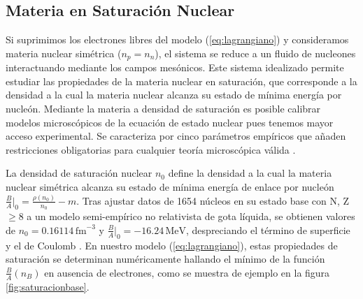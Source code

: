 \subsection{Materia en Saturación Nuclear}

Si suprimimos los electrones libres del modelo (\ref{eq:lagrangiano}) y consideramos materia nuclear simétrica ($n_p = n_n$), el sistema se reduce a un fluido de nucleones interactuando mediante los campos mesónicos. Este sistema idealizado permite estudiar las propiedades de la materia nuclear en saturación, que corresponde a la densidad a la cual la materia nuclear alcanza su estado de mínima energía por nucleón. Mediante la materia a densidad de saturación es posible calibrar modelos microscópicos de la ecuación de estado nuclear pues tenemos mayor acceso experimental. Se caracteriza por cinco parámetros empíricos que añaden restricciones obligatorias para cualquier teoría microscópica válida \cite{kumarTheoreticalExperimentalConstraints2024}.

La densidad de saturación nuclear $n_0$ define la densidad a la cual la materia nuclear simétrica alcanza su estado de mínima energía de enlace por nucleón $\frac{B}{A}\big|_0  = \frac{\rho(n_0)}{n_0} - m$. Tras ajustar datos de 1654 núcleos en su estado base con N, Z $\geq 8$ a un modelo semi-empírico no relativista de gota líquida, se obtienen valores de $n_0 = 0.16114\, \text{fm}^{-3}$ y $\tfrac{B}{A}\big|_0 = -16.24\, \text{MeV}$, despreciando el término de superficie y el de Coulomb \cite{kumarTheoreticalExperimentalConstraints2024, myersNuclearPropertiesAccording1996}. En nuestro modelo (\ref{eq:lagrangiano}), estas propiedades de saturación se determinan numéricamente hallando el mínimo de la función $\tfrac{B}{A}(n_B)$ en ausencia de electrones, como se muestra de ejemplo en la figura \ref{fig:saturacionbase}.

